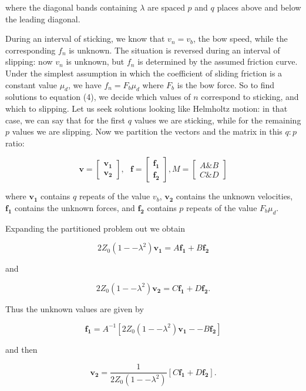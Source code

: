   where the diagonal bands containing $\lambda$ are spaced $p$ and $q$ places 
  above and below the leading diagonal. 

  During an interval of sticking, we know that $v_n=v_b$, the bow speed, while 
  the corresponding $f_n$ is unknown. The situation is reversed during an 
  interval of slipping: now $v_n$ is unknown, but $f_n$ is determined by the 
  assumed friction curve. Under the simplest assumption in which the 
  coefficient of sliding friction is a constant value $\mu_d$, we have $f_n=F_b 
  \mu_d$ where $F_b$ is the bow force. So to find solutions to equation (4), we 
  decide which values of $n$ correspond to sticking, and which to slipping. Let 
  us seek solutions looking like Helmholtz motion: in that case, we can say 
  that for the first $q$ values we are sticking, while for the remaining $p$ 
  values we are slipping. Now we partition the vectors and the matrix in this 
  $q:p$ ratio: 

  $$\mathbf{v}=\begin{bmatrix} \mathbf{v_1}\\ 
  \mathbf{v_2}\end{bmatrix},~~~\mathbf{f}=\begin{bmatrix} \mathbf{f_1}\\ 
  \mathbf{f_2}\end{bmatrix}, M=\begin{bmatrix} A \& B \\ C \& D\end{bmatrix} 
  \tag{6}$$ 

  where $\mathbf{v_1}$ contains $q$ repeats of the value $v_b$, $\mathbf{v_2}$ 
  contains the unknown velocities, $\mathbf{f_1}$ contains the unknown forces, 
  and $\mathbf{f_2}$ contains $p$ repeats of the value $F_b \mu_d$. 

  Expanding the partitioned problem out we obtain 

  $$2 Z_0 (1 -- \lambda^2) \mathbf{v_1}=A \mathbf{f_1}+B\mathbf{f_2} \tag{7}$$ 

  and 

  $$2 Z_0 (1 -- \lambda^2) \mathbf{v_2}=C \mathbf{f_1}+D\mathbf{f_2} . 
  \tag{8}$$ 

  Thus the unknown values are given by 

  $$\mathbf{f_1}=A^{-1} \left[ 2 Z_0 (1 -- \lambda^2) \mathbf{v_1} -- 
  B\mathbf{f_2} \right] \tag{9}$$ 

  and then 

  $$\mathbf{v_2}=\dfrac{1}{2 Z_0 (1 -- \lambda^2)} \left[C 
  \mathbf{f_1}+D\mathbf{f_2} \right] . \tag{10}$$ 

